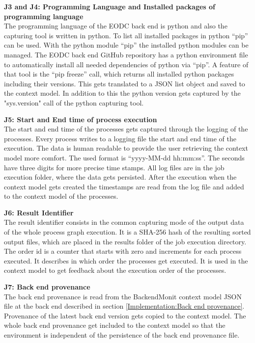 \documentclass[draft,final]{vutinfth} %
\begin{document}
\textbf{J3 and J4: Programming Language and  Installed packages of programming language} \\
The programming language of the EODC back end is python and also the capturing tool is written in python. To list all installed packages in python “pip” can be used. With the python module “pip” the installed python modules can be managed. The EODC back end GitHub repository has a python environment file to automatically install all needed dependencies of python via “pip”. A feature of that tool is the “pip freeze” call, which returns all installed python packages including their versions. This gets translated to a JSON list object and saved to the context model. In addition to this the python version gets captured by the "sys.version" call of the python capturing tool.    

\textbf{J5: Start and End time of process execution} \\
The start and end time of the processes gets captured through the logging of the processes. Every process writes to a logging file the start and end time of the execution. The data is human readable to provide the user retrieving the context model more comfort. The used format is “yyyy-MM-dd hh:mm:ss”. The seconds have three digits for more precise time stamps. All log files are in the job execution folder, where the data gets persisted. After the execution when the context model gets created the timestamps are read from the log file and added to the context model of the processes.

\textbf{J6: Result Identifier } \\
The result identifier consists in the common capturing mode of the output data of the whole process graph execution. It is a SHA-256 hash of the resulting sorted output files, which are placed in the results folder of the job execution directory. The order id is a counter that starts with zero and increments for each process executed. It describes in which order the processes get executed. It is used in the context model to get feedback about the execution order of the processes.

\textbf{J7: Back end provenance} \\
The back end provenance is read from the BackendMonit context model JSON file at the back end described in section \ref{Implementation:Back end provenance}. Provenance of the latest back end version gets copied to the context model. The whole back end provenance get included to the context model so that the environment is independent of the persistence of the back end provenance file. 
\end{document}
